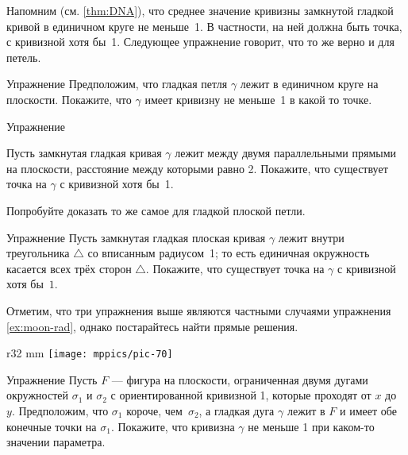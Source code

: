 Напомним (см. \ref{thm:DNA}), что среднее значение кривизны замкнутой гладкой кривой в единичном круге не меньше~1.
В частности, на ней должна быть точка, с кривизной хотя бы~1.
Следующее упражнение говорит, что то же верно и для петель.

\begin{thm}{Упражнение}\label{ex:in-circle}
Предположим, что гладкая петля $\gamma$ лежит в единичном круге на плоскости.
Покажите, что $\gamma$ имеет кривизну не меньше~1 в какой то точке.
\end{thm}


\begin{thm}{Упражнение}\label{ex:between-parallels-1}
{\sloppy
Пусть замкнутая гладкая кривая $\gamma$ лежит между двумя параллельными прямыми на плоскости, расстояние между которыми равно 2.
Покажите, что существует точка на $\gamma$ с кривизной хотя бы~1.

}

Попробуйте доказать то же самое для гладкой плоской петли.
\end{thm}

\begin{thm}{Упражнение}\label{ex:in-triangle}
Пусть замкнутая гладкая плоская кривая $\gamma$ лежит внутри треугольника $\triangle$ со вписанным радиусом~1; то есть единичная окружность касается всех трёх сторон $\triangle$. 
Покажите, что существует точка на $\gamma$ с кривизной хотя бы~$1$.
\end{thm}

Отметим, что три упражнения выше являются частными случаями упражнения \ref{ex:moon-rad},
однако постарайтесь найти прямые решения.

{

\begin{wrapfigure}{r}{32 mm}
\vskip-4mm
\centering
\texttt{[image: mppics/pic-70]}
\vskip0mm
\end{wrapfigure}

\begin{thm}{Упражнение}\label{ex:lens}
Пусть $F$ --- фигура на плоскости, ограниченная двумя дугами окружностей $\sigma_1$ и $\sigma_2$ с ориентированной кривизной 1, которые проходят от $x$ до~$y$.
Предположим, что $\sigma_1$ короче, чем~$\sigma_2$,
а гладкая дуга $\gamma$ лежит в $F$ и имеет обе конечные точки на $\sigma_1$.
Покажите, что кривизна $\gamma$ не меньше 1 при каком-то значении параметра.

\end{thm}

}


